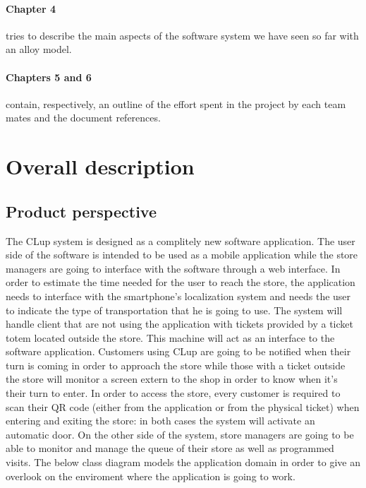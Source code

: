 \documentclass[]{article}
\begin{document}
	\paragraph{Chapter 4} tries to describe the main aspects of the software system we have seen so far with an alloy model.
	
	\paragraph{Chapters 5 and 6} contain, respectively, an outline of the effort spent in the project by each team mates and the document references.
	
	\newpage
	\section{Overall description}
	
		\subsection{Product perspective}
		The CLup system is designed as a complitely new software application. The user side of the software is intended to be used as a mobile application while the store managers are going to interface with the software through a web interface. \newline
		In order to estimate the time needed for the user to reach the store, the application needs to interface with the smartphone's localization system and needs the user to indicate the type of transportation that he is going to use. \newline
		The system will handle client that are not using the application with tickets provided by a ticket totem located outside the store. This machine will act as an interface to the software application. \newline
		Customers using CLup are going to be notified when their turn is coming in order to approach the store while those with a ticket outside the store will monitor a screen extern to the shop in order to know when it's their turn to enter. \newline
		In order to access the store, every customer is required to scan their QR code (either from the application or from the physical ticket) when entering and exiting the store: in both cases the system will activate an automatic door. \newline
		On the other side of the system, store managers are going to be able to monitor and manage the queue of their store as well as programmed visits. \newline
		The below class diagram models the application domain in order to give an overlook on the enviroment where the application is going to work.
		
\end{document}
